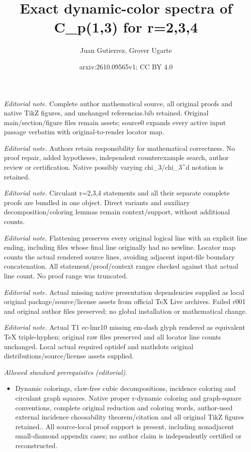 \documentclass[10pt,a4paper]{article}
\title{Exact dynamic-color spectra of C\_p(1,3) for r=2,3,4}
\author{Juan Gutierrez, Grover Ugarte}
\date{arxiv:2610.09565v1; CC BY 4.0}
\theoremstyle{case}
\numberwithin{subcase}{case}
\begin{document}
\maketitle
\noindent\textit{Editorial note.} Complete author mathematical source, all original proofs and native TikZ figures, and unchanged referencias.bib retained. Original main/section/figure files remain assets; source0 expands every active input passage verbatim with original-to-render locator map.\par\medskip
\noindent\textit{Editorial note.} Authors retain responsibility for mathematical correctness. No proof repair, added hypotheses, independent counterexample search, author review or certification. Native possibly varying chi\_3/chi\_3\textasciicircum{}d notation is retained.\par\medskip
\noindent\textit{Editorial note.} Circulant r=2,3,4 statements and all their separate complete proofs are bundled in one object. Direct variants and auxiliary decomposition/coloring lemmas remain context/support, without additional counts.\par\medskip
\noindent\textit{Editorial note.} Flattening preserves every original logical line with an explicit line ending, including files whose final line originally had no newline. Locator map counts the actual rendered source lines, avoiding adjacent input-file boundary concatenation. All statement/proof/context ranges checked against that actual line count. No proof range was truncated.\par\medskip
\noindent\textit{Editorial note.} Actual missing native presentation dependencies supplied as local original package/source/license assets from official TeX Live archives. Failed r001 and original author files preserved; no global installation or mathematical change.\par\medskip
\noindent\textit{Editorial note.} Actual T1 ec-lmr10 missing em-dash glyph rendered as equivalent TeX triple-hyphen; original raw files preserved and all locator line counts unchanged. Local actual required optidef and mathdots original distributions/source/license assets supplied.\par\medskip
\noindent\textit{Allowed standard prerequisites (editorial).}\begin{itemize}
\item Dynamic colorings, claw-free cubic decompositions, incidence coloring and circulant graph squares. Native proper r-dynamic coloring and graph-square conventions, complete original reduction and coloring words, author-used external incidence choosability theorem/citation and all original TikZ figures retained.. All source-local proof support is present, including nonadjacent small-diamond appendix cases; no author claim is independently certified or reconstructed.
\end{itemize}\medskip
\end{document}
